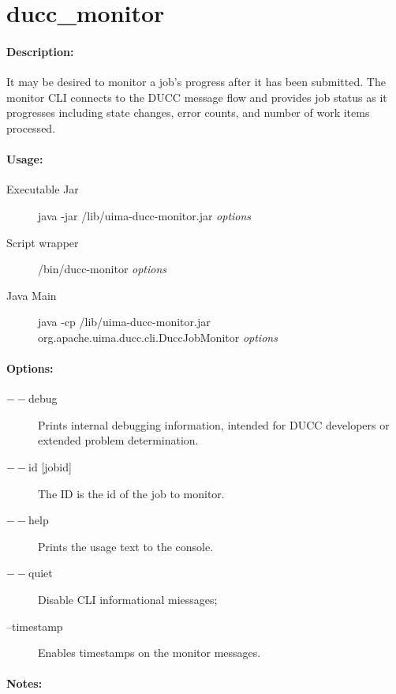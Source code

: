 
\ifpdf
\else
{}
\fi
    \section{ducc\_monitor}

    \paragraph{Description:}
    
    It may be desired to monitor a job's progress after it has been submitted. The monitor CLI 
    connects to the DUCC message flow and provides job status as it progresses including state 
    changes, error counts, and number of work items processed. 
    
    \paragraph{Usage:}
    \begin{description}
    \item[Executable Jar] java -jar \ducchome/lib/uima-ducc-monitor.jar {\em options}
    \item[Script wrapper] \ducchome/bin/ducc-monitor {\em options}
    \item[Java Main]      java -cp \ducchome/lib/uima-ducc-monitor.jar org.apache.uima.ducc.cli.DuccJobMonitor {\em options}
    \end{description}

    \paragraph{Options:}
    \begin{description}
        \item[$--$debug ]          
          Prints internal debugging information, intended for DUCC developers or extended problem determination.
        \item[$--$id {[jobid]}]
          The ID is the id of the job to monitor.
        \item[$--$help]
          Prints the usage text to the console. 
        \item[$--$quiet] 
          Disable CLI informational miessages;
        \item[--timestamp]
          Enables timestamps on the monitor messages.
     \end{description}
        
    \paragraph{Notes:}
